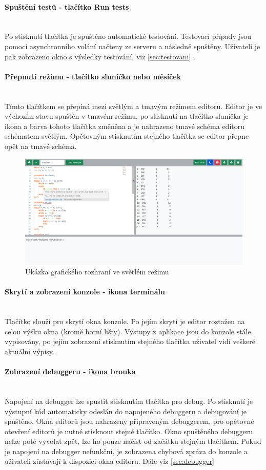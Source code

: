 \documentclass[12pt, letterpaper]{article}
\newcommand{\chapterRef}[1]{\ref{#1} \nameref{#1}}
\newcommand{\myparagraph}[1]{\paragraph{#1}\mbox{}\\}
\begin{document}
\myparagraph{Spuštění testů - tlačítko Run tests}\label{sec:testovaniTlacitko}
Po stisknutí tlačítka je spuštěno automatické testování. Testovací případy jsou pomocí asynchronního volání načteny ze serveru a následně spuštěny. Uživateli je pak zobrazeno okno s výsledky testování, viz \chapterRef{sec:testovani}.

\myparagraph{Přepnutí režimu - tlačítko sluníčko nebo měsíček}
Tímto tlačítkem se přepíná mezi světlým a tmavým režimem editoru. Editor je ve výchozím stavu spuštěn v tmavém režimu, po stisknutí na tlačítko sluníčka je ikona a barva tohoto tlačítka změněna a je nahrazeno tmavé schéma editoru schématem světlým. Opětovným stisknutím stejného tlačítka se editor přepne opět na tmavé schéma.
\begin{figure}[H]
	\centering
	\includegraphics[width=\linewidth]{img/gui_light.png}
	\caption{Ukázka grafického rozhraní ve světlém režimu}
	\label{fig:GUILight}
\end{figure}

\myparagraph{Skrytí a zobrazení konzole - ikona terminálu}
Tlačítko slouží pro skrytí okna konzole. Po jejím skrytí je editor roztažen na celou výšku okna (kromě horní lišty). Výstupy z aplikace jsou do konzole stále vypisovány, po jejím zobrazení stisknutím stejného tlačítka uživatel vidí veškeré aktuální výpisy.

\myparagraph{Zobrazení debuggeru - ikona brouka}
Napojení na debugger lze spustit stisknutím tlačítka pro debug. Po stisknutí je výstupní kód automaticky odeslán do napojeného debuggeru a debugování je spuštěno. Okna editorů jsou nahrazeny připraveným debuggerem, pro opětovné otevření editorů je nutné stisknout stejné tlačítko. Okno spuštěného debuggeru nelze poté vyvolat zpět, lze ho pouze načíst od začátku stejným tlačítkem. Pokud je napojení na debugger nefunkční, je zobrazena chybová zpráva do konzole a uživateli zůstávají k dispozici okna editoru. Dále viz \chapterRef{sec:debugger}
\end{document}
